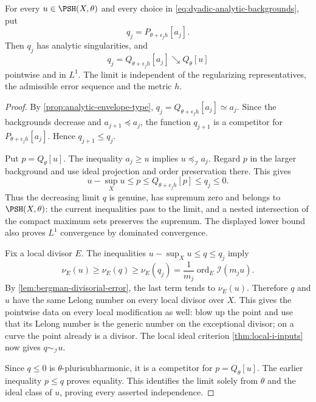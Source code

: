 \begin{theorem}\label{thm:dyadic-analytic-envelope-limit}
For every $u\in\PSH(X,\theta)$ and every choice in \eqref{eq:dyadic-analytic-backgrounds}, put
\[
 q_j=P_{\theta+\epsilon_jh}[a_j].
\]
Then $q_j$ has analytic singularities, and
\[
 q_j=Q_{\theta+\epsilon_jh}[a_j]
       \searrow Q_\theta[u]
\]
pointwise and in $L^1$. The limit is independent of the regularizing representatives, the admissible error sequence and the metric $h$.
\end{theorem}
\begin{proof}
By \cref{prop:analytic-envelope-type}, $q_j=Q_{\theta+\epsilon_jh}[a_j]\simeq a_j$. Since the backgrounds decrease and $a_{j+1}\preceq a_j$, the function $q_{j+1}$ is a competitor for $P_{\theta+\epsilon_jh}[a_j]$. Hence $q_{j+1}\leq q_j$.

Put $p=Q_\theta[u]$. The inequality $a_j\geq u$ implies $u\preceq_{\mathcal I}a_j$. Regard $p$ in the larger background and use ideal projection and order preservation there. This gives
\[
 u-\sup_Xu\leq p\leq
 Q_{\theta+\epsilon_jh}[p]\leq q_j\leq0.
\]
Thus the decreasing limit $q$ is genuine, has supremum zero and belongs to $\PSH(X,\theta)$: the current inequalities pass to the limit, and a nested intersection of the compact maximum sets preserves the supremum. The displayed lower bound also proves $L^1$ convergence by dominated convergence.

Fix a local divisor $E$. The inequalities $u-\sup_Xu\leq q\leq q_j$ imply
\[
 \nu_E(u)\geq\nu_E(q)\geq\nu_E(q_j)
       =\frac1{m_j}\operatorname{ord}_E\mathcal I(m_ju).
\]
By \cref{lem:bergman-divisorial-error}, the last term tends to $\nu_E(u)$. Therefore $q$ and $u$ have the same Lelong number on every local divisor over $X$. This gives the pointwise data on every local modification as well: blow up the point and use that its Lelong number is the generic number on the exceptional divisor; on a curve the point already is a divisor. The local ideal criterion \cref{thm:local-i-inputs} now gives $q\sim_{\mathcal I}u$.

Since $q\leq0$ is $\theta$-plurisubharmonic, it is a competitor for $p=Q_\theta[u]$. The earlier inequality $p\leq q$ proves equality. This identifies the limit solely from $\theta$ and the ideal class of $u$, proving every asserted independence.
\end{proof}

